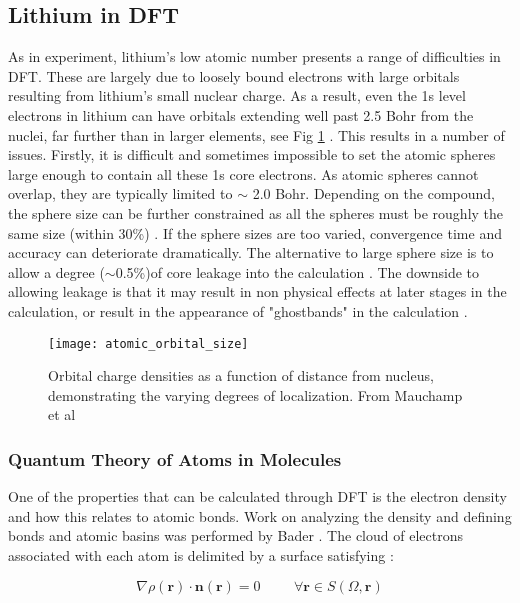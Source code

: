\subsection{Lithium in DFT}
As in experiment, lithium's low atomic number presents a range of difficulties in DFT.  These are largely due to loosely bound electrons with large orbitals resulting from lithium's small nuclear charge.  As a result, even the 1s level electrons in lithium can have orbitals extending well past 2.5 Bohr from the nuclei, far further than in larger elements, see Fig \ref{orbital_size} \cite{mauchamp_ab_2006}.  This results in a number of issues. Firstly, it is difficult and sometimes impossible to set the atomic spheres large enough to contain all these 1s core electrons.  As atomic spheres cannot overlap, they are typically limited to $\sim$ 2.0 Bohr. Depending on the compound, the sphere size can be further constrained as all the spheres must be roughly the same size (within 30\%) \cite{wien2k}.  If the sphere sizes are too varied, convergence time and accuracy can deteriorate dramatically.  The alternative to large sphere size is to allow a degree ($\sim$0.5\%)of core leakage into the calculation \cite{wien2k}.  The downside to allowing leakage is that it may result in non physical effects at later stages in the calculation, or result in the appearance of "ghostbands" in the calculation \cite{wien2k}.

\begin{figure}
	\centering
	\texttt{[image: atomic\_orbital\_size]}
	\caption{Orbital charge densities as a function of distance from nucleus, demonstrating the varying degrees of localization.  From Mauchamp et al \cite{mauchamp_ab_2006}}
	\label{orbital_size}
\end{figure}



\subsubsection{Quantum Theory of Atoms in Molecules} \label{bader-theory}
One of the properties that can be calculated through DFT is the electron density and how this relates to atomic bonds.  Work on analyzing the density and defining bonds and atomic basins was performed by Bader \cite{bader}.  The cloud of electrons associated with each atom is delimited by a surface satisfying \cite{bader_quantum_1991}: 
 

\begin{equation}
\nabla \rho(\textbf{r}) \cdot \textbf{n}(\textbf{r}) = 0   \hspace{1cm} \forall\textbf{r} \in S(\Omega,\textbf{r})
\label{basin_surface}
\end{equation}

